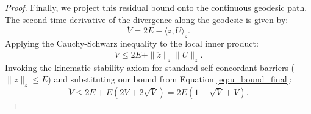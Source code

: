 \begin{proof}
Finally, we project this residual bound onto the continuous geodesic path. The second time derivative of the divergence along the geodesic is given by:
\begin{equation}
    \ddot{V} = 2E - \langle \ddot{z}, U \rangle_z.
\end{equation}
Applying the Cauchy-Schwarz inequality to the local inner product:
\begin{equation}
    \ddot{V} \le 2E + \|\ddot{z}\|_z \|U\|_z.
\end{equation}
Invoking the kinematic stability axiom for standard self-concordant barriers ($\|\ddot{z}\|_z \le E$) and substituting our bound from Equation \ref{eq:u_bound_final}:
\begin{equation}
    \ddot{V} \le 2E + E(2V + 2\sqrt{V}) = 2E(1 + \sqrt{V} + V).
\end{equation}
\end{proof}
























